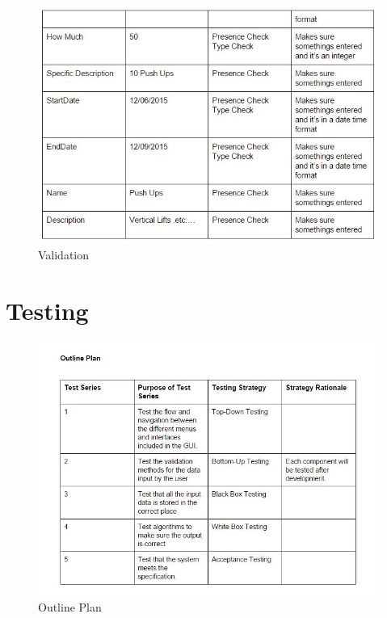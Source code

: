 \begin{itemize}
\begin{figure}[H]
    \includegraphics[width=\textwidth]{Validation3.JPG}
    \caption{Validation} \label{fig:Valdation}
\end{figure}

\section{Testing}

\begin{figure}[H]
    \includegraphics[width=\textwidth]{OutlinePlan.JPG}
    \caption{Outline Plan} \label{fig:Outline Plan}
\end{figure}


\end{itemize}
